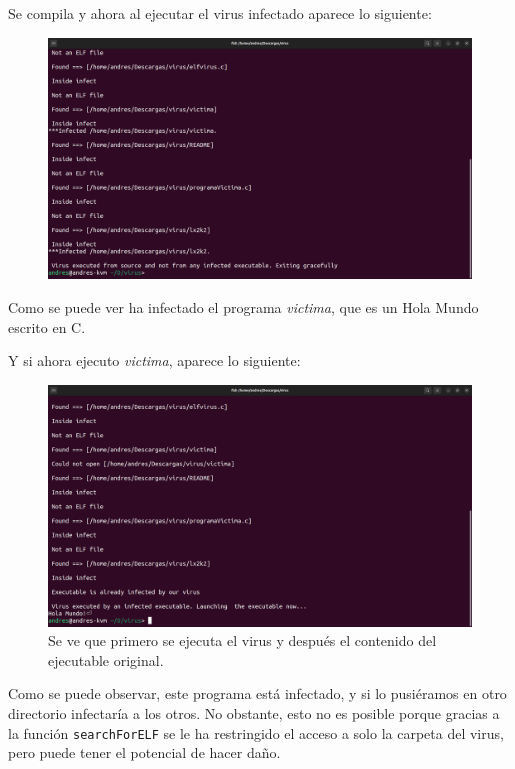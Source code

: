 \documentclass{article}
\begin{document}
\bigskip

Se compila y ahora al ejecutar el virus infectado aparece lo siguiente:

\begin{figure}[H]
    \includegraphics[width=\textwidth]{imagenes/Captura desde 2022-11-23 12-32-53.png}
\end{figure}

Como se puede ver ha infectado el programa \textit{victima}, que es un Hola Mundo escrito en C.

\newpage

Y si ahora ejecuto \textit{victima}, aparece lo siguiente:

\begin{figure}[H]
    \includegraphics[width=\textwidth]{imagenes/victimaInfectada/Captura desde 2022-11-23 12-33-29.png}
    \caption{Se ve que primero se ejecuta el virus y después el contenido del ejecutable original.}
\end{figure}

Como se puede observar, este programa está infectado, y si lo pusiéramos en otro directorio infectaría a los otros. No obstante, esto no es posible porque gracias a la función \verb|searchForELF| se le ha restringido el acceso a solo la carpeta del virus, pero puede tener el potencial de hacer daño.
\end{document}
